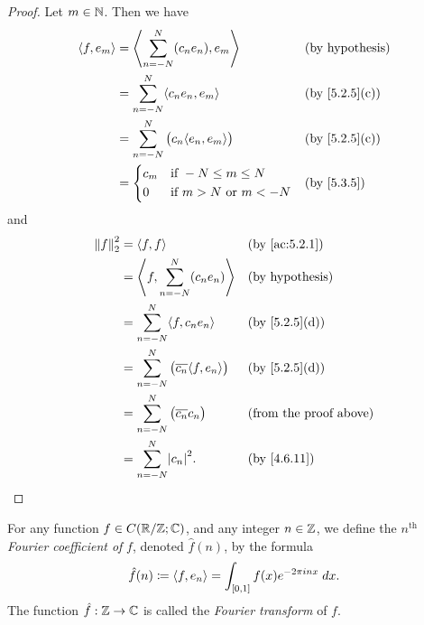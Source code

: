 \begin{proof}
  Let \(m \in \N\).
  Then we have
  \begin{align*}
    \inner*{f, e_m} & = \inner*{\sum_{n = -N}^N (c_n e_n), e_m}         &  & \text{(by hypothesis)}      \\
                    & = \sum_{n = -N}^N \inner*{c_n e_n, e_m}           &  & \text{(by \cref{5.2.5}(c))} \\
                    & = \sum_{n = -N}^N \big(c_n \inner*{e_n, e_m}\big) &  & \text{(by \cref{5.2.5}(c))} \\
                    & = \begin{dcases}
                          c_m & \text{if } -N \leq m \leq N         \\
                          0   & \text{if } m > N \text{ or } m < -N
                        \end{dcases}      &  & \by{5.3.5}
  \end{align*}
  and
  \begin{align*}
    \norm*{f}_2^2 & = \inner*{f, f}                                            &  & \by{ac:5.2.1}                 \\
                  & = \inner*{f, \sum_{n = -N}^N (c_n e_n)}                    &  & \text{(by hypothesis)}        \\
                  & = \sum_{n = -N}^N \inner*{f, c_n e_n}                      &  & \text{(by \cref{5.2.5}(d))}   \\
                  & = \sum_{n = -N}^N \big(\overline{c_n} \inner*{f, e_n}\big) &  & \text{(by \cref{5.2.5}(d))}   \\
                  & = \sum_{n = -N}^N \big(\overline{c_n} c_n\big)             &  & \text{(from the proof above)} \\
                  & = \sum_{n = -N}^N \abs{c_n}^2.                             &  & \by{4.6.11}
  \end{align*}
\end{proof}

\begin{defn}\label{5.3.7}
  For any function \(f \in C(\R / \Z ; \C)\), and any integer \(n \in \Z\), we define the \(n^{\text{th}}\) \emph{Fourier coefficient of} \(f\), denoted \(\hat{f}(n)\), by the formula
  \[
    \hat{f}(n) \coloneqq \inner*{f, e_n} = \int_{[0, 1]} f(x) e^{- 2 \pi i n x} \; dx.
  \]
  The function \(\hat{f} : \Z \to \C\) is called the \emph{Fourier transform} of \(f\).
\end{defn}

